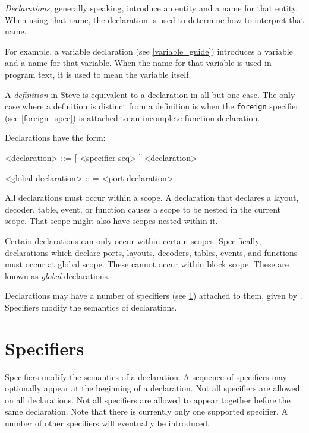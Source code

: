 \textit{Declarations}, generally speaking, introduce an entity and a name for that entity. When using that name, the declaration is used to determine how to interpret that name.

For example, a variable declaration (see \ref{variable_guide}) introduces a variable and a name for that variable. When the name for that variable is used in program text, it is used to mean the variable itself.

A \textit{definition} in Steve is equivalent to a declaration in all but one case. The only case where a definition is distinct from a definition is when the \texttt{foreign} specifier (see \ref{foreign_spec}) is attached to an incomplete function declaration.

Declarations have the form:

\begin{minip}
\begin{grammar}
<declaration> ::=
[ <specifier-seq> ] <declaration>

<global-declaration> :: =
<port-declaration>
\end{grammar}
\end{minip}

All declarations must occur within a scope. A declaration that declares a layout, decoder, table, event, or function causes a scope to be nested in the current scope. That scope might also have scopes nested within it.

Certain declarations can only occur within certain scopes. Specifically, declarations which declare ports, layouts, decoders, tables, events, and functions must occur at global scope. These cannot occur within block scope. These are known as \textit{global} declarations.

Declarations may have a number of specifiers (see \ref{spec_guide}) attached to them, given by . Specifiers modify the semantics of declarations.

\section{Specifiers} \label{spec_guide}

Specifiers modify the semantics of a declaration. A sequence of specifiers may optionally appear at the beginning of a declaration. Not all specifiers are allowed on all declarations. Not all specifiers are allowed to appear together before the same declaration. Note that there is currently only one supported specifier. A number of other specifiers will eventually be introduced.


